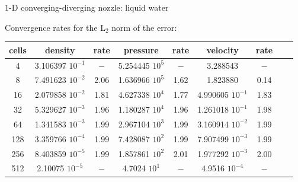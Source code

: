 \documentclass[xcolor=dvipsnames,10pt]{beamer}
\begin{document}
\begin{frame}{$1$-D converging-diverging nozzle: liquid water}
\begin{center}
Convergence rates for the L$_2$ norm of the error:
\end{center}
\begin{table}[H]
\begin{center}
 \begin{tabular}{|c|c|c|c|c|c|c|c|c|}
 \hline
cells& density            & rate & pressure          & rate & velocity           & rate \\ \hline
4    & 3.106397 $10^{-1}$ & $-$  & 5.254445 $10^{5}$ & $-$  & 3.288543           & $-$  \\ \hline
8    & 7.491623 $10^{-2}$ & 2.06 & 1.636966 $10^{5}$ & 1.62 & 1.823880           & 0.14 \\ \hline
16   & 2.079858 $10^{-2}$ & 1.81 & 4.627338 $10^{4}$ & 1.77 & 4.990605 $10^{-1}$ & 1.83 \\ \hline
32   & 5.329627 $10^{-3}$ & 1.96 & 1.180287 $10^{4}$ & 1.96 & 1.261018 $10^{-1}$ & 1.98 \\ \hline
64   & 1.341583 $10^{-3}$ & 1.99 & 2.967104 $10^{3}$ & 1.99 & 3.160914 $10^{-2}$ & 1.99 \\ \hline
128  & 3.359766 $10^{-4}$ & 1.99 & 7.428087 $10^{2}$ & 1.99 & 7.907499 $10^{-3}$ & 1.99 \\ \hline
256  & 8.403859 $10^{-5}$ & 1.99 & 1.857861 $10^{2}$ & 2.01 & 1.977292 $10^{-3}$ & 2.00 \\ \hline
512  & 2.10075  $10^{-5}$ & $-$ & 4.7024   $10^{1}$ & $-$ & 4.9516   $10^{-4}$ & $-$ \\ \hline
\end{tabular}
\end{center}
\end{table}
\end{frame}
\end{document}
